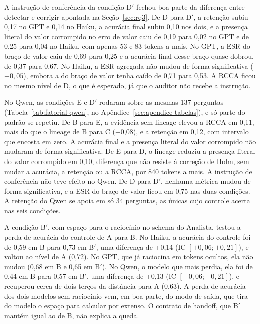 A instrução de conferência da condição D$'$ fechou boa parte da diferença entre detectar e corrigir apontada na Seção~\ref{sec:rq3}.
De D para D$'$, a retenção subiu 0,17 no GPT e 0,14 no Haiku, a acurácia final subiu 0,10 nos dois, e a presença literal do valor corrompido no erro de valor caiu de 0,19 para 0,02 no GPT e de 0,25 para 0,04 no Haiku, com apenas 53 e 83 tokens a mais.
No GPT, a ESR do braço de valor caiu de 0,69 para 0,25 e a acurácia final desse braço quase dobrou, de 0,37 para 0,67. No Haiku, a ESR agregada não mudou de forma significativa ($-0{,}05$), embora a do braço de valor tenha caído de 0,71 para 0,53.
A RCCA ficou no mesmo nível de D, o que é esperado, já que o auditor não recebe a instrução.

No Qwen, as condições E e D$'$ rodaram sobre as mesmas 137 perguntas (Tabela~\ref{tab:fatorial-qwen}, no Apêndice~\ref{sec:apendice-tabelas}), e só parte do padrão se repetiu.
De B para E, a evidência sem lineage elevou a RCCA em 0,11, mais do que o lineage de B para C (+0,08), e a retenção em 0,12, com intervalo que encosta em zero. A acurácia final e a presença literal do valor corrompido não mudaram de forma significativa.
De E para D, o lineage reduziu a presença literal do valor corrompido em 0,10, diferença que não resiste à correção de Holm, sem mudar a acurácia, a retenção ou a RCCA, por 840 tokens a mais.
A instrução de conferência não teve efeito no Qwen. De D para D$'$, nenhuma métrica mudou de forma significativa, e a ESR do braço de valor ficou em 0,75 nas duas condições.
A retenção do Qwen se apoia em só 34 perguntas, as únicas cujo controle acerta nas seis condições.



A condição B$'$, com espaço para o raciocínio no schema do Analista, testou a perda de acurácia do controle de A para B.
No Haiku, a acurácia do controle foi de 0,59 em B para 0,73 em B$'$, uma diferença de +0,14 (IC $[+0{,}06; +0{,}21]$), e voltou ao nível de A (0,72).
No GPT, que já raciocina em tokens ocultos, ela não mudou (0,68 em B e 0,65 em B$'$).
No Qwen, o modelo que mais perdia, ela foi de 0,44 em B para 0,57 em B$'$, uma diferença de +0,13 (IC $[+0{,}06; +0{,}21]$), e recuperou cerca de dois terços da distância para A (0,63).
A perda de acurácia dos dois modelos sem raciocínio vem, em boa parte, do modo de saída, que tira do modelo o espaço para calcular por extenso. O contrato de handoff, que B$'$ mantém igual ao de B, não explica a queda.

